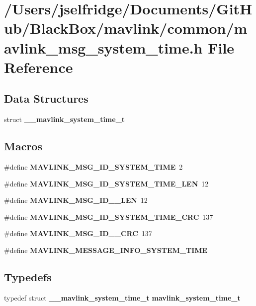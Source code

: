 \section{/\+Users/jselfridge/\+Documents/\+Git\+Hub/\+Black\+Box/mavlink/common/mavlink\+\_\+msg\+\_\+system\+\_\+time.h File Reference}
\label{mavlink__msg__system__time_8h}
\subsection*{Data Structures}
\begin{DoxyCompactItemize}
\item 
struct \textbf{ \+\_\+\+\_\+mavlink\+\_\+system\+\_\+time\+\_\+t}
\end{DoxyCompactItemize}
\subsection*{Macros}
\begin{DoxyCompactItemize}
\item 
\#define \textbf{ M\+A\+V\+L\+I\+N\+K\+\_\+\+M\+S\+G\+\_\+\+I\+D\+\_\+\+S\+Y\+S\+T\+E\+M\+\_\+\+T\+I\+ME}~2
\item 
\#define \textbf{ M\+A\+V\+L\+I\+N\+K\+\_\+\+M\+S\+G\+\_\+\+I\+D\+\_\+\+S\+Y\+S\+T\+E\+M\+\_\+\+T\+I\+M\+E\+\_\+\+L\+EN}~12
\item 
\#define \textbf{ M\+A\+V\+L\+I\+N\+K\+\_\+\+M\+S\+G\+\_\+\+I\+D\+\_\+\_\+\+L\+EN}~12
\item 
\#define \textbf{ M\+A\+V\+L\+I\+N\+K\+\_\+\+M\+S\+G\+\_\+\+I\+D\+\_\+\+S\+Y\+S\+T\+E\+M\+\_\+\+T\+I\+M\+E\+\_\+\+C\+RC}~137
\item 
\#define \textbf{ M\+A\+V\+L\+I\+N\+K\+\_\+\+M\+S\+G\+\_\+\+I\+D\+\_\+\_\+\+C\+RC}~137
\item 
\#define \textbf{ M\+A\+V\+L\+I\+N\+K\+\_\+\+M\+E\+S\+S\+A\+G\+E\+\_\+\+I\+N\+F\+O\+\_\+\+S\+Y\+S\+T\+E\+M\+\_\+\+T\+I\+ME}
\end{DoxyCompactItemize}
\subsection*{Typedefs}
\begin{DoxyCompactItemize}
\item 
typedef struct \textbf{ \+\_\+\+\_\+mavlink\+\_\+system\+\_\+time\+\_\+t} \textbf{ mavlink\+\_\+system\+\_\+time\+\_\+t}
\end{DoxyCompactItemize}


